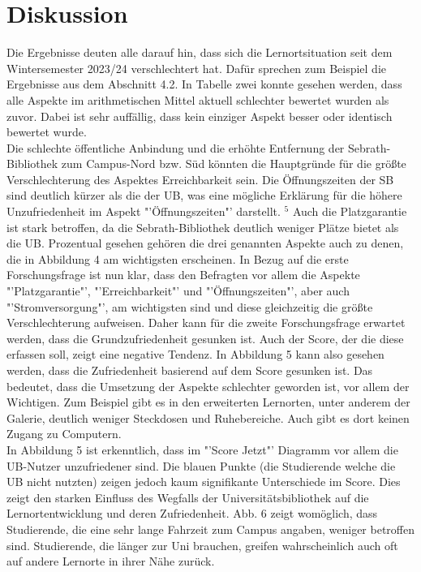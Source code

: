\documentclass[11pt, a4paper]{article}
\begin{document}
\section{Diskussion}
Die Ergebnisse deuten alle darauf hin, dass sich die Lernortsituation seit dem Wintersemester  2023/24 verschlechtert hat. Dafür sprechen zum Beispiel die Ergebnisse aus dem Abschnitt 4.2. In Tabelle zwei konnte gesehen werden, dass alle Aspekte im arithmetischen Mittel aktuell schlechter bewertet wurden als zuvor. Dabei ist sehr auffällig, dass kein einziger Aspekt besser oder identisch bewertet wurde.\\
Die schlechte öffentliche Anbindung und die erhöhte Entfernung der Sebrath-Bibliothek zum Campus-Nord bzw. Süd könnten die Hauptgründe für die größte Verschlechterung des Aspektes Erreichbarkeit sein. Die Öffnungszeiten der SB sind deutlich kürzer als die der UB, was eine mögliche Erklärung für die höhere Unzufriedenheit im Aspekt "'Öffnungszeiten"' darstellt. \hyperref[seitenverweis]{$^5$}
Auch die Platzgarantie ist stark betroffen, da die Sebrath-Bibliothek deutlich weniger Plätze bietet als die UB. 
Prozentual gesehen gehören die drei genannten Aspekte auch zu denen, die in Abbildung 4 am wichtigsten erscheinen.
In Bezug auf die erste Forschungsfrage ist nun klar, dass den Befragten vor allem die Aspekte "'Platzgarantie"', "'Erreichbarkeit"' und "'Öffnungszeiten"', aber auch "'Stromversorgung"', am wichtigsten sind und diese gleichzeitig die größte Verschlechterung aufweisen. Daher kann für die zweite Forschungsfrage erwartet werden, dass die Grundzufriedenheit gesunken ist.
Auch der Score, der die diese erfassen soll, zeigt eine negative Tendenz. In Abbildung 5 kann also gesehen werden, dass die Zufriedenheit basierend auf dem Score gesunken ist.
Das bedeutet, dass die Umsetzung der Aspekte schlechter geworden ist, vor allem der Wichtigen. Zum Beispiel gibt es in den erweiterten Lernorten, unter anderem der Galerie, deutlich weniger Steckdosen und Ruhebereiche. Auch gibt es dort keinen Zugang zu Computern.  \\ In Abbildung 5 ist erkenntlich, dass im "'Score Jetzt"' Diagramm vor allem die UB-Nutzer unzufriedener sind. Die blauen Punkte (die Studierende welche die UB nicht nutzten) zeigen jedoch kaum signifikante Unterschiede im Score. Dies zeigt den starken Einfluss des Wegfalls der Universitätsbibliothek auf die Lernortentwicklung und deren Zufriedenheit. Abb. 6 zeigt womöglich, dass Studierende, die eine sehr lange Fahrzeit zum Campus angaben, weniger betroffen sind. Studierende, die länger zur Uni brauchen, greifen wahrscheinlich auch oft auf andere Lernorte in ihrer Nähe zurück. \\
\end{document}
